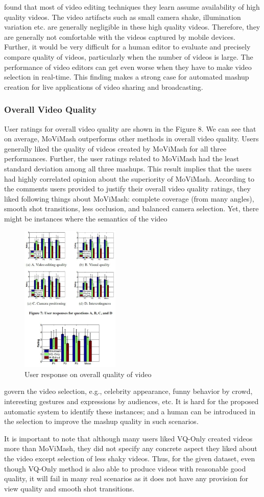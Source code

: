\documentclass{sig-alternate-05-2015}
\begin{document}
found
that most of video editing techniques they learn assume availability
of high quality videos. The video artifacts such as small camera shake, illumination variation etc. are generally negligible in these
high quality videos. Therefore, they are generally not comfortable
with the videos captured by mobile devices. Further, it would be
very difficult for a human editor to evaluate and precisely compare
quality of videos, particularly when the number of videos is large.
The performance of video editors can get even worse when they
have to make video selection in real-time. This finding makes a
strong case for automated mashup creation for live applications of
video sharing and broadcasting.
\subsubsection{Overall Video Quality}
User ratings for overall video quality are shown in the Figure 8.
We can see that on average, MoViMash outperforms other methods in overall video quality. Users generally liked the quality of
videos created by MoViMash for all three performances. Further,
the user ratings related to MoViMash had the least standard deviation among all three mashups. This result implies that the users
had highly correlated opinion about the superiority of MoViMash.
According to the comments users provided to justify their overall
video quality ratings, they liked following things about MoViMash:
complete coverage (from many angles), smooth shot transitions,
less occlusion, and balanced camera selection. Yet, there might
be instances where the semantics of the video 
\begin{figure}
\centering
\includegraphics[width=1\linewidth,height=200pt]{video_5.pdf}
\caption{User response on overall quality of video}
\end{figure}
govern the video
selection, e.g., celebrity appearance, funny behavior by crowd, interesting gestures and expressions by audiences, etc. It is hard for
the proposed automatic system to identify these instances; and a
human can be introduced in the selection to improve the mashup
quality in such scenarios.\par
It is important to note that although many users liked VQ-Only
created videos more than MoViMash, they did not specify any concrete aspect they liked about the video except selection of less
shaky videos. Thus, for the given dataset, even though VQ-Only
method is also able to produce videos with reasonable good quality,
it will fail in many real scenarios as it does not have any provision
for view quality and smooth shot transitions.
\end{document}
